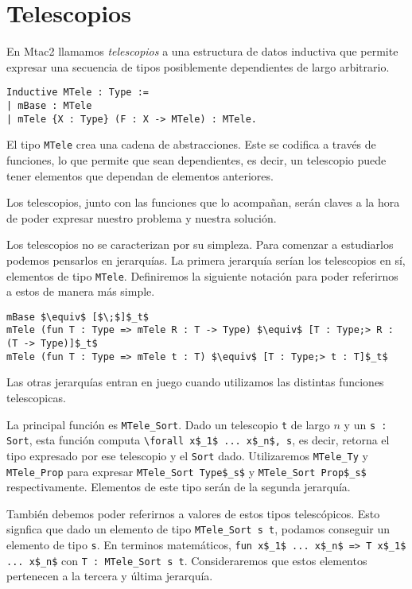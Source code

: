 \section{Telescopios}

En Mtac2 llamamos \textit{telescopios} a una estructura de datos inductiva
que permite expresar una secuencia de tipos posiblemente dependientes de largo arbitrario.

\begin{lstlisting}
Inductive MTele : Type :=
| mBase : MTele
| mTele {X : Type} (F : X -> MTele) : MTele.
\end{lstlisting}


El tipo \lstinline{MTele} crea una cadena de abstracciones.
Este se codifica a través de funciones, lo que permite que sean dependientes, es decir, un telescopio puede tener elementos que dependan de elementos anteriores.

Los telescopios, junto con las funciones que lo acompañan, serán claves a la hora de poder expresar nuestro problema y nuestra solución.

Los telescopios no se caracterizan por su simpleza.
Para comenzar a estudiarlos podemos pensarlos en jerarquías.
La primera jerarquía serían los telescopios en sí, elementos de tipo \lstinline{MTele}. Definiremos la siguiente notación para poder referirnos a estos de manera más simple.

\begin{lstlisting}
mBase $\equiv$ [$\;$]$_t$
mTele (fun T : Type => mTele R : T -> Type) $\equiv$ [T : Type;> R : (T -> Type)]$_t$
mTele (fun T : Type => mTele t : T) $\equiv$ [T : Type;> t : T]$_t$
\end{lstlisting}

Las otras jerarquías entran en juego cuando utilizamos las distintas funciones telescopicas.

La principal función es \lstinline{MTele_Sort}.
Dado un telescopio \lstinline{t} de largo $n$ y un \lstinline{s : Sort}, esta función computa \lstinline{\forall x$_1$ ... x$_n$, s}, es decir, retorna el tipo expresado por ese telescopio y el \lstinline{Sort} dado.
Utilizaremos \lstinline{MTele_Ty} y \lstinline{MTele_Prop} para expresar \lstinline{MTele_Sort Type$_s$} y \lstinline{MTele_Sort Prop$_s$} respectivamente. Elementos de este tipo serán de la segunda jerarquía.

También debemos poder referirnos a valores de estos tipos telescópicos. Esto signfica que dado un elemento de tipo \lstinline{MTele_Sort s t}, podamos conseguir un elemento de tipo \lstinline{s}. En terminos matemáticos, \lstinline{fun x$_1$ ... x$_n$ => T x$_1$ ... x$_n$} con \lstinline{T : MTele_Sort s t}. Consideraremos que estos elementos pertenecen a la tercera y última jerarquía.

